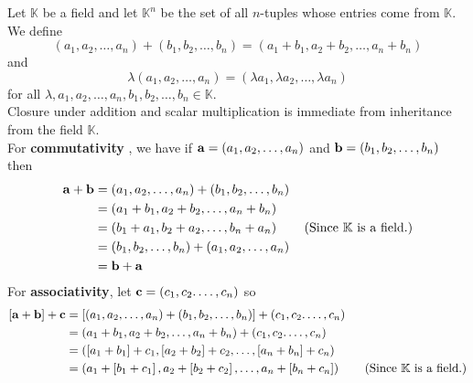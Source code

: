 \begin{example}
  Let \( \mathbb{K} \) be a field and let \( \mathbb{K}^{n} \) be the set of all \( n \)-tuples whose entries come from \( \mathbb{K} \). We define 
  \[ \left( a_{1}, a_{2}, \dots, a_{n} \right) + \left( b_{1}, b_{2}, \dots , b_{n} \right) = \left( a_{1} +b_{1}, a_{2} +b_{2}, \dots, a_{n} +b_{n} \right) \] and 
  \[ \lambda \left( a_{1}, a_{2}, \dots, a_{n} \right) = \left( \lambda a_{1}, \lambda a_{2}, \dots , \lambda a_{n} \right) \] for all \( \lambda , a_{1}, a_{2}, \dots, a_{n},b_{1}, b_{2}, \dots , b_{n} \in \mathbb{K} \). \\ 
  Closure under addition and scalar multiplication is immediate from inheritance from the field \( \mathbb{K} \). \\ 
  For \textbf{commutativity} , we have if \( \vb{a} =  \left( a_{1}, a_{2}, \dots, a_{n} \right) \) and \( \vb{b} =  \left( b_{1}, b_{2}, \dots , b_{n} \right) \) then 
  \begin{align*}
    \vb{a} + \vb{b} &= \left( a_{1}, a_{2}, \dots, a_{n} \right) + \left( b_{1}, b_{2}, \dots , b_{n} \right) \\
    &= \left( a_{1} +b_{1}, a_{2} +b_{2}, \dots, a_{n} +b_{n} \right) \\
    &=  \left( b_{1} +a_{1}, b_{2} +a_{2}, \dots, b_{n} +a_{n} \right) \tag{Since $\mathbb{K}$ is a field.}\\
    &= \left( b_{1}, b_{2}, \dots , b_{n} \right) + \left( a_{1}, a_{2}, \dots, a_{n} \right) \\
    &= \vb{b} + \vb{a}
  \end{align*}
  For \textbf{associativity}, let \( \vb{c} = \left( c_{1}, c_{2}. \dots, c_{n} \right) \) so 
  \begin{align*}
    \left[ \vb{a} + \vb{b} \right] + \vb{c} &= \left[ \left( a_{1}, a_{2}, \dots, a_{n} \right) + \left( b_{1}, b_{2}, \dots , b_{n} \right) \right] + \left( c_{1}, c_{2}. \dots, c_{n} \right) \\
    &= \left( a_{1} +b_{1}, a_{2} +b_{2}, \dots, a_{n} +b_{n} \right) + \left( c_{1}, c_{2}. \dots, c_{n} \right) \\
    &= \left( \left[ a_{1} +b_{1} \right]  + c_{1},  \left[ a_{2} +b_{2} \right]  + c_{2}, \dots, \left[ a_{n} +b_{n} \right]  + c_{n} \right) \\
    &= \left( a_{1} + \left[ b_{1} + c_{1} \right] , a_{2} + \left[ b_{2} + c_{2} \right], \dots, a_{n} + \left[ b_{n} + c_{n} \right]  \right) \tag{Since $\mathbb{K}$ is a field.}  \\

\end{align*}
\end{example}
